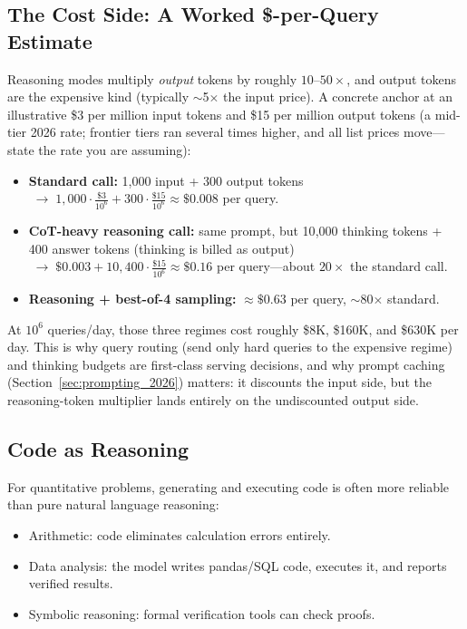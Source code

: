 \subsection{The Cost Side: A Worked \$-per-Query Estimate}

Reasoning modes multiply \emph{output} tokens by roughly $10$--$50\times$,
and output tokens are the expensive kind (typically $\sim$5$\times$ the
input price).  A concrete anchor at an illustrative \$3 per million input tokens and \$15 per
million output tokens (a mid-tier 2026 rate; frontier tiers ran several times
higher, and all list prices move---state the rate you are assuming):

\begin{itemize}[leftmargin=*]
\item \textbf{Standard call:} 1{,}000 input + 300 output tokens
  $\;\to\; 1{,}000 \cdot \tfrac{\$3}{10^6} + 300 \cdot \tfrac{\$15}{10^6}
  \approx \$0.008$ per query.
\item \textbf{CoT-heavy reasoning call:} same prompt, but 10{,}000 thinking
  tokens + 400 answer tokens (thinking is billed as output)
  $\;\to\; \$0.003 + 10{,}400 \cdot \tfrac{\$15}{10^6} \approx \$0.16$
  per query---about $20\times$ the standard call.
\item \textbf{Reasoning + best-of-4 sampling:} $\approx \$0.63$ per query,
  $\sim$80$\times$ standard.
\end{itemize}

At $10^6$ queries/day, those three regimes cost roughly \$8K, \$160K, and
\$630K per day.  This is why query routing (send only hard queries to the
expensive regime) and thinking budgets are first-class serving decisions,
and why prompt caching (Section~\ref{sec:prompting_2026}) matters: it
discounts the input side, but the reasoning-token multiplier lands entirely
on the undiscounted output side.

\subsection{Code as Reasoning}

For quantitative problems, generating and executing code is often more
reliable than pure natural language reasoning:
\begin{itemize}[leftmargin=*]
\item Arithmetic: code eliminates calculation errors entirely.
\item Data analysis: the model writes pandas/SQL code, executes it, and
  reports verified results.
\item Symbolic reasoning: formal verification tools can check proofs.
\end{itemize}

